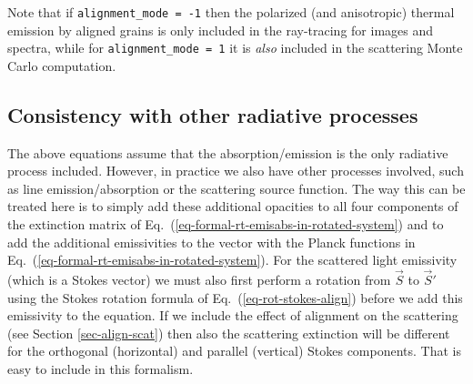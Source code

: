 \documentclass{report}
\begin{document}
Note that if {\small\tt alignment\_mode = -1} then the polarized (and
anisotropic) thermal emission by aligned grains is only included in the
ray-tracing for images and spectra, while for {\small\tt alignment\_mode =
  1} it is {\em also} included in the scattering Monte Carlo computation.


\subsection{Consistency with other radiative processes}
The above equations assume that the absorption/emission is the only
radiative process included. However, in practice we also have other
processes involved, such as line emission/absorption or the scattering
source function. The way this can be treated here is to simply add these
additional opacities to all four components of the extinction matrix of
Eq.~(\ref{eq-formal-rt-emisabs-in-rotated-system}) and to add the additional
emissivities to the vector with the Planck functions in
Eq.~(\ref{eq-formal-rt-emisabs-in-rotated-system}). For the scattered light
emissivity (which is a Stokes vector) we must also first perform a rotation
from $\vec S$ to $\vec S'$ using the Stokes rotation formula of
Eq.~(\ref{eq-rot-stokes-align}) before we add this emissivity to the
equation. If we include the effect of alignment on the scattering
(see Section \ref{sec-align-scat}) then also the scattering extinction
will be different for the orthogonal (horizontal) and parallel (vertical)
Stokes components. That is easy to include in this formalism.
\end{document}
